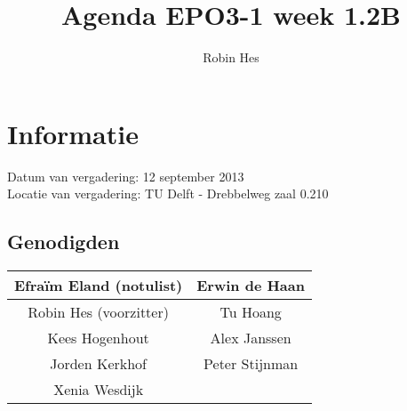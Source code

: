 \documentclass{article}
\begin{document}
\title{Agenda EPO3-1 week 1.2B}%
\author{Robin Hes}%
\maketitle

\section*{Informatie}
Datum van vergadering: 12 september 2013\\ %
Locatie van vergadering: TU Delft - Drebbelweg zaal 0.210 %
\subsection*{Genodigden}
\begin{center}
\begin{tabular}{|c |c |}
	\hline
	Efraïm Eland (notulist) & Erwin de Haan \\
	\hline
	Robin Hes (voorzitter) & Tu Hoang \\
	\hline
	Kees Hogenhout & Alex Janssen\\
	\hline
	Jorden Kerkhof & Peter Stijnman \\
	\hline
	Xenia Wesdijk & \\
	\hline
\end{tabular}
\end{center}
\end{document}

